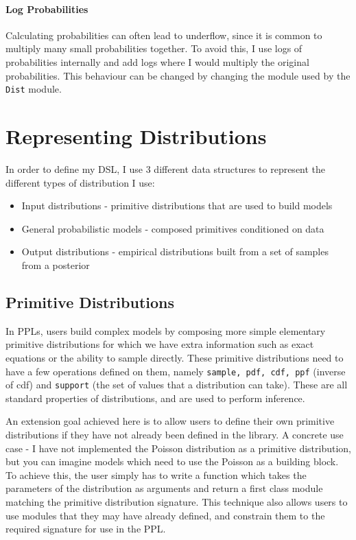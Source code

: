 \paragraph{Log Probabilities} 
Calculating probabilities can often lead to underflow, since it is common to multiply many small probabilities together. To avoid this, I use logs of probabilities internally and add logs where I would multiply the original probabilities. This behaviour can be changed by changing the module used by the \texttt{Dist} module. 
	
\section{Representing Distributions}
In order to define my DSL, I use 3 different data structures to represent the different types of distribution I use:
\begin{itemize}
	\item Input distributions - primitive distributions that are used to build models
	\item General probabilistic models - composed primitives conditioned on data
	\item Output distributions - empirical distributions built from a set of samples from a posterior
\end{itemize}
\vspace{2mm}
\subsection{Primitive Distributions}
In PPLs, users build complex models by composing more simple elementary primitive distributions for which we have extra information such as exact equations or the ability to sample directly. These primitive distributions need to have a few operations defined on them, namely \texttt{sample, pdf, cdf, ppf} (inverse of cdf) and \texttt{support} (the set of values that a distribution can take). These are all standard properties of distributions, and are used to perform inference.

An extension goal achieved here is to allow users to define their own primitive distributions if they have not already been defined in the library. A concrete use case - I have not implemented the Poisson distribution as a primitive distribution, but you can imagine models which need to use the Poisson as a building block. To achieve this, the user simply has to write a function which takes the parameters of the distribution as arguments and return a first class module matching the primitive distribution signature. This technique also allows users to use modules that they may have already defined, and constrain them to the required signature for use in the PPL.
	
